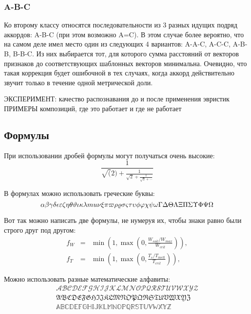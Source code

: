 \subsubsection{A-B-C}

Ко второму классу относятся последовательности из 3 разных идущих подряд
аккордов: A-B-C (при этом возможно A=C). В этом случае более вероятно, что на
самом деле имел место один из следующих 4 вариантов: A-A-C, A-C-C, A-B-B,
B-B-C. Из них выбирается тот, для которого сумма расстояний от векторов
признаков до соответствующих шаблонных векторов минимальна. Очевидно, что такая
коррекция будет ошибочной в тех случаях, когда аккорд действительно звучит
только в течение одной метрической доли.

ЭКСПЕРИМЕНТ: качество распознавания до и после применения эвристик
ПРИМЕРЫ композиций, где это работает и где не работает


\subsection{Формулы} \label{subsect1_3_2}

При использовании дробей формулы могут получаться очень высокие:
$$
  \frac{1}{\sqrt(2)+
  \displaystyle\frac{1}{\sqrt{2}+
  \displaystyle\frac{1}{\sqrt{2}+\cdots}}}
$$

В формулах можно использовать греческие буквы:
$$
\alpha\beta\gamma\delta\epsilon\varepsilon\zeta\eta\theta\vartheta\iota\kappa\lambda\\mu\nu\xi\pi\varpi\rho\varrho\sigma\varsigma\tau\upsilon\phi\varphi\chi\psi\omega\Gamma\Delta\Theta\Lambda\Xi\Pi\Sigma\Upsilon\Phi\Psi\Omega
$$

Вот так можно написать две формулы, не нумеруя их, чтобы знаки равно были строго друг под другом:
\begin{eqnarray}
  f_W & = & \min \left( 1, \max \left( 0, \frac{W_{soil} / W_{max}}{W_{crit}} \right)  \right), \nonumber \\
  f_T & = & \min \left( 1, \max \left( 0, \frac{T_s / T_{melt}}{T_{crit}} \right)  \right), \nonumber
\end{eqnarray}

Можно использовать разные математические алфавиты:
\begin{eqnarray}
\mathcal{ABCDEFGHIJKLMNOPQRSTUVWXYZ} \nonumber \\
\mathfrak{ABCDEFGHIJKLMNOPQRSTUVWXYZ} \nonumber \\
\mathbb{ABCDEFGHIJKLMNOPQRSTUVWXYZ} \nonumber
\end{eqnarray}

